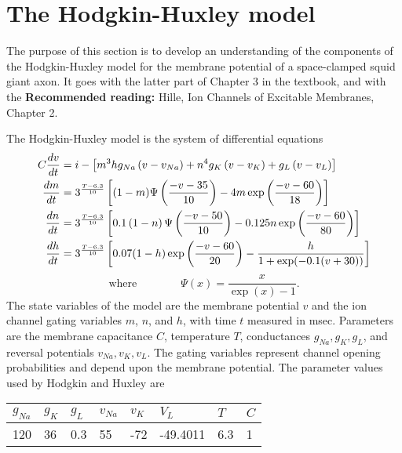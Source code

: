 \documentclass [11pt]{article}
\numberwithin{exercise}{section}
\begin{document}
\section{The Hodgkin-Huxley model}
The purpose of this section is to develop an understanding of the 
components of the Hodgkin-Huxley model for the membrane potential of
a space-clamped squid giant axon. It goes with the latter part
of Chapter 3 in the textbook, and with the \textbf{Recommended reading:} 
Hille, Ion Channels of Excitable Membranes, Chapter 2.

The Hodgkin-Huxley model is the system of differential equations
\begin{equation}
\begin{aligned} 
C \frac{dv}{dt} & =i - \left[m^{3}h g_{Na}\left(v-v_{Na}\right) 
+n^{4}g_{K}\left(v-v_{K}\right) +g_{L} \left(v-v_{L}\right) \right]  \\
\frac{dm}{dt}& =3^\frac{T-6.3}{10} \left[ (1-m) \Psi\left(\frac{-v-35}{10}\right) 
-4m \exp \left(\frac{-v-60}{18}\right) \right] \\
\frac{dn}{dt}&=3^\frac{T-6.3}{10} \left[ 0.1 \left( {1-n} \right) \Psi \left(\frac{-v-50}{10} \right) 
-0.125 n \exp \left(\frac{-v-60}{80} \right) \right]  \\
\frac{dh}{dt}&=3^\frac{T-6.3}{10} \left[0.07 {\left( {1-h}\right) 
\exp \nolimits \left( {{{-v-60} \over {20}}}\right) -{{h} \over {1+ \exp \nolimits ({-0.1(v+30)})}}} \right] 
\end{aligned}
\label{HHfull} 
\end{equation}
$$ \mbox{where} \qquad \qquad \Psi(x) = \frac{x}{\exp(x) - 1}. $$
The state variables of the model are the membrane potential $v$ and the ion channel
gating variables $m$, $n$, and $h$, with time $t$ measured in msec. Parameters are 
the membrane capacitance $C$, temperature $T$, conductances $g_{Na},g_K,g_L$, 
and reversal potentials $v_{Na},v_K,v_L$. The gating variables represent channel 
opening probabilities and depend upon the membrane potential.
The parameter values used by Hodgkin and Huxley are 
\begin{table}[h!]
\label{HHparams}
\begin{center}
\begin{tabular}
{|p{30pt}|p{30pt}|p{30pt}|p{30pt}|p{30pt}|p{50pt}|p{30pt}|p{30pt}|}
\hline
$g_{Na}$& 
$g_K$& 
$g_L$& 
$v_{Na}$& 
$v_K$& 
$V_L$& 
$T$& 
$C$ \\
\hline
120& 
36& 
0.3& 
55& 
-72& 
-49.4011& 
6.3& 
1 \\
\hline
\end{tabular}
\end{center}
\end{table}
\end{document}
